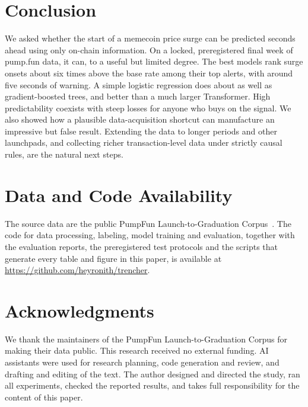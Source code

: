 \section{Conclusion}
\label{sec:conclusion}

We asked whether the start of a memecoin price surge can be predicted seconds ahead using only on-chain information. On a locked, preregistered final week of pump.fun data, it can, to a useful but limited degree. The best models rank surge onsets about six times above the base rate among their top alerts, with around five seconds of warning. A simple logistic regression does about as well as gradient-boosted trees, and better than a much larger Transformer. High predictability coexists with steep losses for anyone who buys on the signal. We also showed how a plausible data-acquisition shortcut can manufacture an impressive but false result. Extending the data to longer periods and other launchpads, and collecting richer transaction-level data under strictly causal rules, are the natural next steps.

\section*{Data and Code Availability}
The source data are the public PumpFun Launch-to-Graduation Corpus~\citep{slinkdev2026corpus}. The code for data processing, labeling, model training and evaluation, together with the evaluation reports, the preregistered test protocols and the scripts that generate every table and figure in this paper, is available at \url{https://github.com/heyronith/trencher}.

\section*{Acknowledgments}
We thank the maintainers of the PumpFun Launch-to-Graduation Corpus for making their data public. This research received no external funding. AI assistants were used for research planning, code generation and review, and drafting and editing of the text. The author designed and directed the study, ran all experiments, checked the reported results, and takes full responsibility for the content of this paper.
